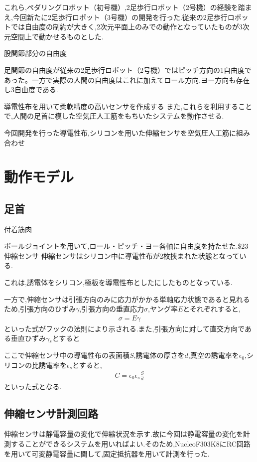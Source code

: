これら,ペダリングロボット（初号機）,2足歩行ロボット（2号機）の経験を踏まえ,今回新たに2足歩行ロボット（3号機）の開発を行った.従来の2足歩行ロボットでは自由度の制約が大きく,2次元平面上のみでの動作となっていたものが3次元空間上で動かせるものとした.

股関節部分の自由度

足関節の自由度が従来の2足歩行ロボット（2号機）ではピッチ方向の1自由度であった。一方で実際の人間の自由度はこれに加えてロール方向,ヨー方向も存在し3自由度である.


導電性布を用いて柔軟精度の高いセンサを作成する
また,これらを利用することで,人間の足首に模した空気圧人工筋をもちいたシステムを動作させる.

今回開発を行った導電性布,シリコンを用いた伸縮センサを空気圧人工筋に組み合わせ
\section{動作モデル}
\subsection{足首}
付着筋肉 %

ボールジョイントを用いて,ロール・ピッチ・ヨー各軸に自由度を持たせた.\$23伸縮センサ
伸縮センサはシリコン中に導電性布が2枚挟まれた状態となっている.

これは,誘電体をシリコン,極板を導電性布としたにしたものとなっている.

一方で,伸縮センサは引張方向のみに応力がかかる単軸応力状態であると見れるため,引張方向のひずみ$\gamma$,引張方向の垂直応力$\sigma$,ヤング率$E$とそれぞれすると,
\begin{eqnarray}
    \sigma=E\gamma
    \label{フックの法則}
\end{eqnarray}
といった式がフックの法則により示される.また,引張方向に対して直交方向である垂直ひずみ$\gamma{}_s$とすると

ここで伸縮センサ中の導電性布の表面積$S$,誘電体の厚さを$d$,真空の誘電率を$\epsilon{}_0$,シリコンの比誘電率を$\epsilon{}_s$とすると,
\begin{eqnarray}
    C=\epsilon{}_0\epsilon{}_s\frac{S}{d}
\end{eqnarray}
といった式となる.

\subsection{伸縮センサ計測回路}
伸縮センサは静電容量の変化で伸縮状況を示す.故に今回は静電容量の変化を計測することができるシステムを用いればよい.そのため,NucleoF303K8にRC回路を用いて可変静電容量に関して,固定抵抗器を用いて計測を行った.


